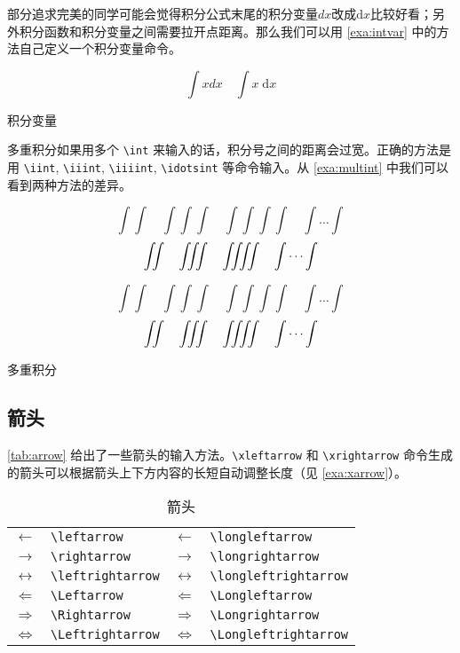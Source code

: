 部分追求完美的同学可能会觉得积分公式末尾的积分变量$dx$改成$\mathrm{d}x$比较好看；另外积分函数和积分变量之间需要拉开点距离。那么我们可以用 \autoref{exa:intvar} 中的方法自己定义一个积分变量命令。

\begin{example}[h]
\begin{BTDemo}[]
\newcommand{\myd}{\;\mathrm{d}}
\[ \int x dx\quad \int x \myd x \]
\end{BTDemo}
\caption{积分变量}
\label{exa:intvar}
\end{example}

多重积分如果用多个 \verb|\int| 来输入的话，积分号之间的距离会过宽。正确的方法是用 \verb|\iint|, \verb|\iiint|, \verb|\iiiint|, \verb|\idotsint| 等命令输入。从 \autoref{exa:multint} 中我们可以看到两种方法的差异。

\begin{Code}[]
\[ \int\int\quad \int\int\int\quad 
  \int\int\int\int\quad \int\dots\int \]
\[ \iint\quad \iiint\quad \iiiint\quad \idotsint \]
\end{Code}

\begin{example}[h]
\begin{Demo}
\[ \int\int\quad \int\int\int\quad 
  \int\int\int\int\quad \int\dots\int \]
\[ \iint\quad \iiint\quad \iiiint\quad \idotsint \]
\end{Demo}
\caption{多重积分}
\label{exa:multint}
\end{example}

\subsection{箭头}

\autoref{tab:arrow} 给出了一些箭头的输入方法。\verb|\xleftarrow| 和 \verb|\xrightarrow| 命令生成的箭头可以根据箭头上下方内容的长短自动调整长度（见 \autoref{exa:xarrow}）。

\begin{table}[htbp]
\caption{箭头}
\label{tab:arrow}
\centering
\begin{tabular}{llll}
  \toprule
  $\leftarrow$       & \verb|\leftarrow|      & 
    $\longleftarrow$       & \verb|\longleftarrow| \\
  $\rightarrow$      & \verb|\rightarrow|     & 
    $\longrightarrow$      & \verb|\longrightarrow| \\
  $\leftrightarrow$  & \verb|\leftrightarrow| & 
    $\longleftrightarrow$  & \verb|\longleftrightarrow| \\
  $\Leftarrow$       & \verb|\Leftarrow|      & 
    $\Longleftarrow$       & \verb|\Longleftarrow| \\
  $\Rightarrow$      & \verb|\Rightarrow|     & 
    $\Longrightarrow$      & \verb|\Longrightarrow| \\
  $\Leftrightarrow$  & \verb|\Leftrightarrow| & 
    $\Longleftrightarrow$  & \verb|\Longleftrightarrow| \\
  \bottomrule
\end{tabular}
\end{table}

